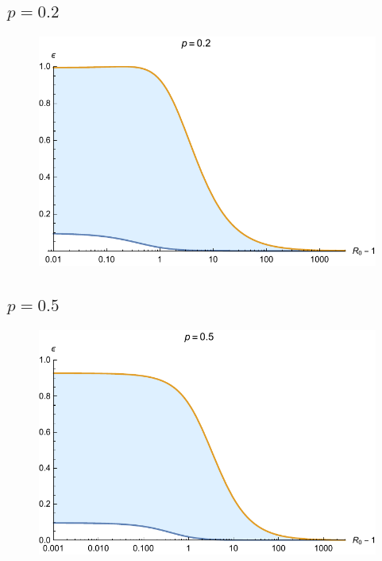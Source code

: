 \documentclass[12pt]{article}
\begin{document}
\subsection{$p=0.2$}
\begin{figure}[H]
  \caption{}
  \centering
  \includegraphics[width=1\textwidth]{Figures/p_0_2.pdf}
\end{figure}

\subsection{$p=0.5$}
\begin{figure}[H]
  \caption{}
  \centering
  \includegraphics[width=1\textwidth]{Figures/p_0_5.pdf}
\end{figure}
\end{document}
